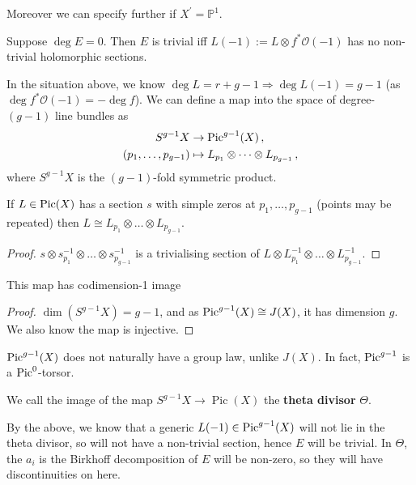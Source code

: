 \documentclass{article}
\begin{document}
Moreover we can specify further if $X^\prime= \mathbb{P}^1$. 
\begin{prop}
	Suppose $\deg E=0$. Then $E$ is trivial iff $L(-1) := L \otimes f^\ast \mathcal{O}(-1)$ has no non-trivial holomorphic sections. 
\end{prop}
In the situation above, we know $\deg L = r+g-1 \Rightarrow \deg L(-1) = g-1$ (as $\deg f^\ast \mathcal{O}(-1) = -\deg f$). We can define a map into the space of degree-$(g-1)$ line bundles as 
\begin{align*}
	S^{g-1}X &\to \operatorname{Pic}^{g-1}(X) \, , \\
	(p_1, \dots, p_{g-1}) &\mapsto L_{p_1} \otimes \dots \otimes L_{p_{g-1}} \, ,
\end{align*}
where $S^{g-1}X$ is the $(g-1)$-fold symmetric product. 
\begin{lemma}
If $L \in \operatorname{Pic}(X)$ has a section $s$ with simple zeros at $p_1, \dots, p_{g-1}$ (points may be repeated) then $L \cong L_{p_1} \otimes \dots \otimes L_{p_{g-1}}$.
\end{lemma}
\begin{proof}
	$s \otimes s_{p_1}^{-1} \otimes \dots \otimes s_{p_{g-1}}^{-1}$ is a trivialising section of $L \otimes L_{p_1}^{-1} \otimes \dots \otimes L_{p_{g-1}}^{-1}$. 
\end{proof}
\begin{prop}
	This map has codimension-1 image
\end{prop}
\begin{proof}
	$\dim (S^{g-1}X)=g-1$, and as $\operatorname{Pic}^{g-1}(X) \cong J(X)$, it has dimension $g$. We also know the map is injective. 
\end{proof}
\begin{remark}
	$\operatorname{Pic}^{g-1}(X)$ does not naturally have a group law, unlike $J(X)$. In fact, $\operatorname{Pic}^{g-1}$ is a $\operatorname{Pic}^0$-torsor. 
\end{remark}
\begin{definition}\label{def: theta divisor (from line bundles)}
	We call the image of the map $S^{g-1}X \to \operatorname{Pic}(X)$ the \textbf{theta divisor} $\Theta$. 
\end{definition}
By the above, we know that a generic $L(-1)\in \operatorname{Pic}^{g-1}(X)$ will not lie in the theta divisor, so will not have a non-trivial section, hence $E$ will be trivial. In $\Theta$, the $a_i$ is the Birkhoff decomposition of $E$ will be non-zero, so they will have discontinuities on here. 

\end{document}
